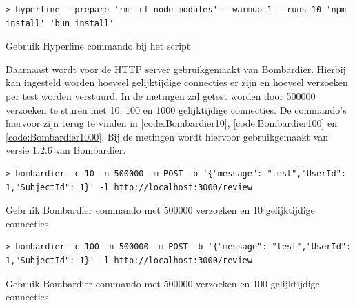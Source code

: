 \begin{listing}[H]
  \centering
  \begin{verbatim}
> hyperfine --prepare 'rm -rf node_modules' --warmup 1 --runs 10 'npm install' 'bun install'
      \end{verbatim}
      \caption{\label{code:HyperfineInstall}Gebruik Hyperfine commando bij het script}
\end{listing}
Daarnaast wordt voor de HTTP server gebruikgemaakt van Bombardier. 
Hierbij kan ingesteld worden hoeveel gelijktijdige connecties er zijn en hoeveel verzoeken per test worden verstuurd.
In de metingen zal getest worden door 500000 verzoeken te sturen met 10, 100 en 1000 gelijktijdige connecties.
De commando's hiervoor zijn terug te vinden in \ref{code:Bombardier10}, \ref{code:Bombardier100} en \ref{code:Bombardier1000}.
Bij de metingen wordt hiervoor gebruikgemaakt van versie 1.2.6 van Bombardier.
\begin{listing}[H]
  \centering
  \begin{verbatim}
> bombardier -c 10 -n 500000 -m POST -b '{"message": "test","UserId": 1,"SubjectId": 1}' -l http://localhost:3000/review
      \end{verbatim}
      \caption{\label{code:Bombardier10}Gebruik Bombardier commando met 500000 verzoeken en 10 gelijktijdige connecties}
\end{listing}
\begin{listing}[H]
  \centering
  \begin{verbatim}
> bombardier -c 100 -n 500000 -m POST -b '{"message": "test","UserId": 1,"SubjectId": 1}' -l http://localhost:3000/review
      \end{verbatim}
      \caption{\label{code:Bombardier100}Gebruik Bombardier commando met 500000 verzoeken en 100 gelijktijdige connecties}
\end{listing}
